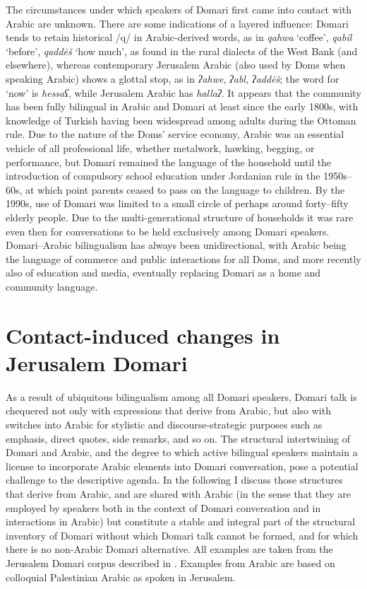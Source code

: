 \documentclass[output=paper]{langsci/langscibook}
\begin{document}
The circumstances under which speakers of Domari first came into contact with Arabic are unknown. There are some indications of a layered influence: Domari tends to retain historical /q/ in Arabic-derived words, as in \textit{qahwa} ‘coffee’, \textit{qabil} ‘before’, \textit{qaddēš} ‘how much’, as found in the rural dialects of the West Bank (and elsewhere), whereas contemporary Jerusalem Arabic (also used by Doms when speaking Arabic) shows a glottal stop, as in \textit{ʔahwe}, \textit{ʔabl,} \textit{ʔaddēš}; the word for ‘now’ is \textit{hessaʕ}, while Jerusalem Arabic has \textit{hallaʔ}. It appears that the community has been fully bilingual in Arabic and Domari at least since the early 1800s, with knowledge of Turkish having been widespread among adults during the Ottoman rule. Due to the nature of the Doms’ service economy, Arabic was an essential vehicle of all professional life, whether metalwork, hawking, begging, or performance, but Domari remained the language of the household until the introduction of compulsory school education under Jordanian rule in the 1950s–60s, at which point parents ceased to pass on the language to children. By the 1990s, use of Domari was limited to a small circle of perhaps around forty–fifty elderly people. Due to the multi-generational structure of households it was rare even then for conversations to be held exclusively among Domari speakers. Domari–Arabic bilingualism has always been unidirectional, with Arabic being the language of commerce and public interactions for all Doms, and more recently also of education and media, eventually replacing Domari as a home and community language.

\section{Contact-induced changes in Jerusalem Domari
}

As a result of ubiquitous bilingualism among all Domari speakers, Domari talk is chequered not only with expressions that derive from Arabic, but also with switches into Arabic for stylistic and discourse-strategic purposes such as emphasis, direct quotes, side remarks, and so on. The structural intertwining of Domari and Arabic, and the degree to which active bilingual speakers maintain a license to incorporate Arabic elements into Domari conversation, pose a potential challenge to the descriptive agenda. In the following I discuss those structures that derive from Arabic, and are shared with Arabic (in the sense that they are employed by speakers both in the context of Domari conversation and in interactions in Arabic) but constitute a stable and integral part of the structural inventory of Domari without which Domari talk cannot be formed, and for which there is no non-Arabic Domari alternative. All examples are taken from the Jerusalem Domari corpus described in \citet{Matras2012}. Examples from Arabic are based on colloquial Palestinian Arabic as spoken in Jerusalem.
\end{document}
